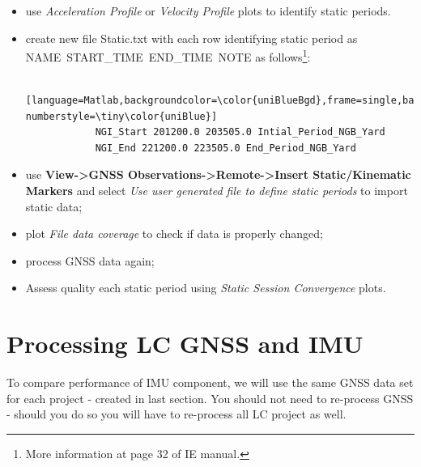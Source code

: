 \documentclass[11pt,fleqn]{book} %
\begin{document}
\begin{itemize}
	\item use \emph{Acceleration Profile} or \emph{Velocity Profile} plots to identify static periods.
	\item create new file Static.txt with each row identifying static period as NAME~START\_TIME~END\_TIME~NOTE as follows\footnote{More information at page 32 of IE manual.}:

		\begin{lstlisting} [language=Matlab,backgroundcolor=\color{uniBlueBgd},frame=single,basicstyle=\footnotesize,numbers=left,numbersep=5pt, numberstyle=\tiny\color{uniBlue}]
			NGI_Start 201200.0 203505.0 Intial_Period_NGB_Yard
			NGI_End 221200.0 223505.0 End_Period_NGB_Yard
		\end{lstlisting}

	\item use \textbf{View->GNSS Observations->Remote->Insert Static/Kinematic Markers} and select \textit{Use user generated file to define static periods} to import static data;
	\item plot \textit{File data coverage} to check if data is properly changed;
	\item process GNSS data again;
	\item Assess quality each static period using \emph{Static Session Convergence} plots. 
\end{itemize}

\vspace{2cm}


\chapter{Processing LC GNSS and IMU\label{sec:Processing-Loosely-Coupled}}

To compare performance of IMU component, we will use the same GNSS data set for each project - created in last section. You should not need to re-process GNSS - should you do so you will have to re-process all LC project as well.  
\end{document}
